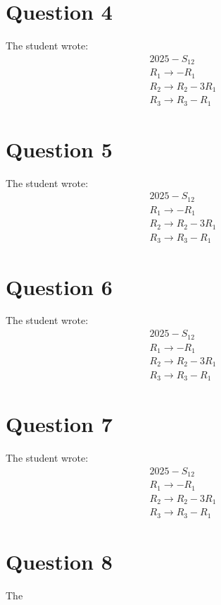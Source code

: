 \documentclass[12pt]{article}
\begin{document}
\section*{Question 4}
The student wrote:
\[
\begin{array}{l}
2025-S_{12} \\
R_{1} \rightarrow -R_{1} \\
R_{2} \rightarrow R_{2}-3R_{1} \\
R_{3} \rightarrow R_{3}-R_{1}
\end{array}
\]

\section*{Question 5}
The student wrote:
\[
\begin{array}{l}
2025-S_{12} \\
R_{1} \rightarrow -R_{1} \\
R_{2} \rightarrow R_{2}-3R_{1} \\
R_{3} \rightarrow R_{3}-R_{1}
\end{array}
\]

\section*{Question 6}
The student wrote:
\[
\begin{array}{l}
2025-S_{12} \\
R_{1} \rightarrow -R_{1} \\
R_{2} \rightarrow R_{2}-3R_{1} \\
R_{3} \rightarrow R_{3}-R_{1}
\end{array}
\]

\section*{Question 7}
The student wrote:
\[
\begin{array}{l}
2025-S_{12} \\
R_{1} \rightarrow -R_{1} \\
R_{2} \rightarrow R_{2}-3R_{1} \\
R_{3} \rightarrow R_{3}-R_{1}
\end{array}
\]

\section*{Question 8}
The
\end{document}
